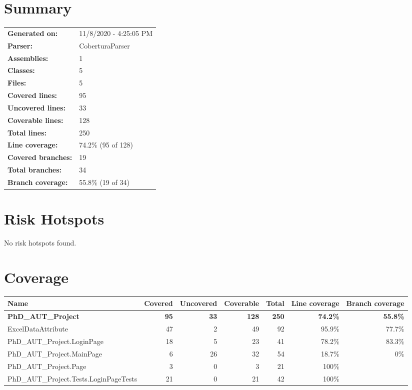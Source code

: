 \documentclass[a4paper,landscape,10pt]{article}
\begin{document}
\setcounter{secnumdepth}{-1}
\section{Summary}
\begin{longtable}[l]{ll}
\textbf{Generated on:} & 11/8/2020 - 4:25:05 PM\\
\textbf{Parser:} & CoberturaParser\\
\textbf{Assemblies:} & 1\\
\textbf{Classes:} & 5\\
\textbf{Files:} & 5\\
\textbf{Covered lines:} & 95\\
\textbf{Uncovered lines:} & 33\\
\textbf{Coverable lines:} & 128\\
\textbf{Total lines:} & 250\\
\textbf{Line coverage:} & 74.2\% (95 of 128)\\
\textbf{Covered branches:} & 19\\
\textbf{Total branches:} & 34\\
\textbf{Branch coverage:} & 55.8\% (19 of 34)\\
\end{longtable}
\section{Risk Hotspots}
No risk hotspots found.
\section{Coverage}
\begin{longtable}[l]{|l|r|r|r|r|r|r|}
\hline
\textbf{Name} & \textbf{Covered} & \textbf{Uncovered} & \textbf{Coverable} & \textbf{Total} & \textbf{Line coverage} & \textbf{Branch coverage}\\
\hline
\textbf{PhD\_AUT\_Project} & \textbf{95} & \textbf{33} & \textbf{128} & \textbf{250} & \textbf{74.2\%} & \textbf{55.8\%}\\
\hline
ExcelDataAttribute & 47 & 2 & 49 & 92 & 95.9\% & 77.7\%\\
\hline
PhD\_AUT\_Project.LoginPage & 18 & 5 & 23 & 41 & 78.2\% & 83.3\%\\
\hline
PhD\_AUT\_Project.MainPage & 6 & 26 & 32 & 54 & 18.7\% & 0\%\\
\hline
PhD\_AUT\_Project.Page & 3 & 0 & 3 & 21 & 100\% & \\
\hline
PhD\_AUT\_Project.Tests.LoginPageTests & 21 & 0 & 21 & 42 & 100\% & \\
\hline
\end{longtable}
\newpage
\end{document}

